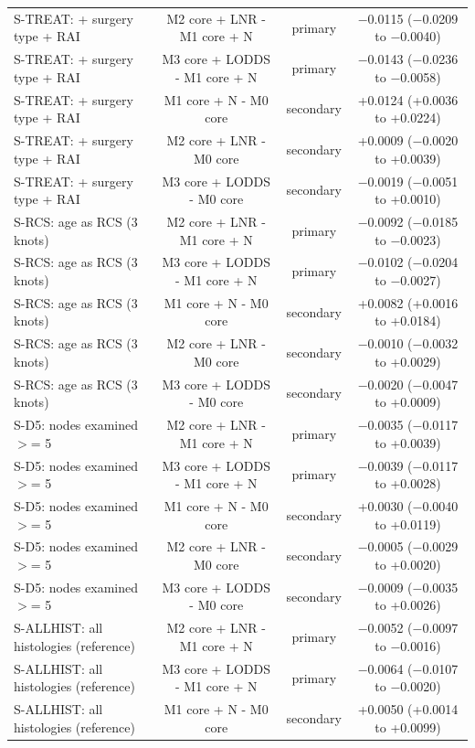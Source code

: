 \begin{table}[htbp]
\begin{tabular*}{\textwidth}{@{\extracolsep{\fill}}lccc@{}}
S-TREAT: + surgery type + RAI & M2 core + LNR - M1 core + N & primary & $-$0.0115 ($-$0.0209 to $-$0.0040) \\
S-TREAT: + surgery type + RAI & M3 core + LODDS - M1 core + N & primary & $-$0.0143 ($-$0.0236 to $-$0.0058) \\
S-TREAT: + surgery type + RAI & M1 core + N - M0 core & secondary & +0.0124 (+0.0036 to +0.0224) \\
S-TREAT: + surgery type + RAI & M2 core + LNR - M0 core & secondary & +0.0009 ($-$0.0020 to +0.0039) \\
S-TREAT: + surgery type + RAI & M3 core + LODDS - M0 core & secondary & $-$0.0019 ($-$0.0051 to +0.0010) \\
S-RCS: age as RCS (3 knots) & M2 core + LNR - M1 core + N & primary & $-$0.0092 ($-$0.0185 to $-$0.0023) \\
S-RCS: age as RCS (3 knots) & M3 core + LODDS - M1 core + N & primary & $-$0.0102 ($-$0.0204 to $-$0.0027) \\
S-RCS: age as RCS (3 knots) & M1 core + N - M0 core & secondary & +0.0082 (+0.0016 to +0.0184) \\
S-RCS: age as RCS (3 knots) & M2 core + LNR - M0 core & secondary & $-$0.0010 ($-$0.0032 to +0.0029) \\
S-RCS: age as RCS (3 knots) & M3 core + LODDS - M0 core & secondary & $-$0.0020 ($-$0.0047 to +0.0009) \\
S-D5: nodes examined $>$= 5 & M2 core + LNR - M1 core + N & primary & $-$0.0035 ($-$0.0117 to +0.0039) \\
S-D5: nodes examined $>$= 5 & M3 core + LODDS - M1 core + N & primary & $-$0.0039 ($-$0.0117 to +0.0028) \\
S-D5: nodes examined $>$= 5 & M1 core + N - M0 core & secondary & +0.0030 ($-$0.0040 to +0.0119) \\
S-D5: nodes examined $>$= 5 & M2 core + LNR - M0 core & secondary & $-$0.0005 ($-$0.0029 to +0.0020) \\
S-D5: nodes examined $>$= 5 & M3 core + LODDS - M0 core & secondary & $-$0.0009 ($-$0.0035 to +0.0026) \\
S-ALLHIST: all histologies (reference) & M2 core + LNR - M1 core + N & primary & $-$0.0052 ($-$0.0097 to $-$0.0016) \\
S-ALLHIST: all histologies (reference) & M3 core + LODDS - M1 core + N & primary & $-$0.0064 ($-$0.0107 to $-$0.0020) \\
S-ALLHIST: all histologies (reference) & M1 core + N - M0 core & secondary & +0.0050 (+0.0014 to +0.0099) \\

\end{tabular*}
\end{table}
